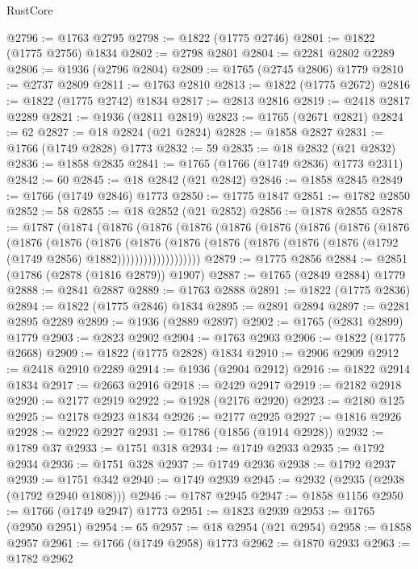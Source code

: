 \begin{lexlean}{RustCore}
\begin{coremodule}
@2796 := @1763 @2795
@2798 := @1822 (@1775 @2746)
@2801 := @1822 (@1775 @2756) @1834
@2802 := @2798 @2801
@2804 := @2281 @2802 @2289
@2806 := @1936 (@2796 @2804)
@2809 := @1765 (@2745 @2806) @1779
@2810 := @2737 @2809
@2811 := @1763 @2810
@2813 := @1822 (@1775 @2672)
@2816 := @1822 (@1775 @2742) @1834
@2817 := @2813 @2816
@2819 := @2418 @2817 @2289
@2821 := @1936 (@2811 @2819)
@2823 := @1765 (@2671 @2821)
@2824 := 62
@2827 := @18 @2824 (@21 @2824)
@2828 := @1858 @2827
@2831 := @1766 (@1749 @2828) @1773
@2832 := 59
@2835 := @18 @2832 (@21 @2832)
@2836 := @1858 @2835
@2841 := @1765 (@1766 (@1749 @2836) @1773 @2311)
@2842 := 60
@2845 := @18 @2842 (@21 @2842)
@2846 := @1858 @2845
@2849 := @1766 (@1749 @2846) @1773
@2850 := @1775 @1847
@2851 := @1782 @2850
@2852 := 58
@2855 := @18 @2852 (@21 @2852)
@2856 := @1878 @2855
@2878 := @1787
    (@1874
      (@1876
        (@1876
          (@1876
            (@1876
              (@1876
                (@1876
                  (@1876
                    (@1876
                      (@1876
                        (@1876
                          (@1876
                            (@1876
                              (@1876
                                (@1876
                                  (@1876 (@1876 (@1876 (@1792 (@1749 @2856) @1882)))))))))))))))))))
@2879 := @1775 @2856
@2884 := @2851 (@1786 (@2878 (@1816 @2879)) @1907)
@2887 := @1765 (@2849 @2884) @1779
@2888 := @2841 @2887
@2889 := @1763 @2888
@2891 := @1822 (@1775 @2836)
@2894 := @1822 (@1775 @2846) @1834
@2895 := @2891 @2894
@2897 := @2281 @2895 @2289
@2899 := @1936 (@2889 @2897)
@2902 := @1765 (@2831 @2899) @1779
@2903 := @2823 @2902
@2904 := @1763 @2903
@2906 := @1822 (@1775 @2668)
@2909 := @1822 (@1775 @2828) @1834
@2910 := @2906 @2909
@2912 := @2418 @2910 @2289
@2914 := @1936 (@2904 @2912)
@2916 := @1822 @2914 @1834
@2917 := @2663 @2916
@2918 := @2429 @2917
@2919 := @2182 @2918
@2920 := @2177 @2919
@2922 := @1928 (@2176 @2920)
@2923 := @2180 @125
@2925 := @2178 @2923 @1834
@2926 := @2177 @2925
@2927 := @1816 @2926
@2928 := @2922 @2927
@2931 := @1786 (@1856 (@1914 @2928))
@2932 := @1789 @37
@2933 := @1751 @318
@2934 := @1749 @2933
@2935 := @1792 @2934
@2936 := @1751 @328
@2937 := @1749 @2936
@2938 := @1792 @2937
@2939 := @1751 @342
@2940 := @1749 @2939
@2945 := @2932 (@2935 (@2938 (@1792 @2940 @1808)))
@2946 := @1787 @2945
@2947 := @1858 @1156
@2950 := @1766 (@1749 @2947) @1773
@2951 := @1823 @2939
@2953 := @1765 (@2950 @2951)
@2954 := 65
@2957 := @18 @2954 (@21 @2954)
@2958 := @1858 @2957
@2961 := @1766 (@1749 @2958) @1773
@2962 := @1870 @2933
@2963 := @1782 @2962

\end{coremodule}
\end{lexlean}
